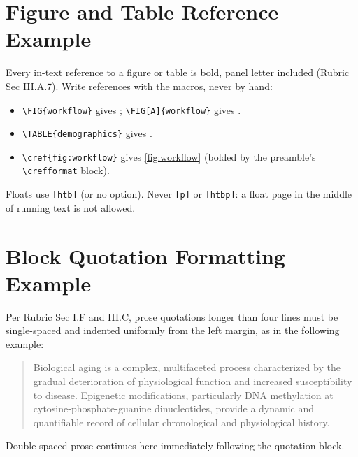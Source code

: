 \section{Figure and Table Reference Example}
Every in-text reference to a figure or table is bold, panel letter included (Rubric Sec III.A.7). Write references with the macros, never by hand:
\begin{itemize}
  \item \verb|\FIG{workflow}| gives ; \verb|\FIG[A]{workflow}| gives .
  \item \verb|\TABLE{demographics}| gives .
  \item \verb|\cref{fig:workflow}| gives \cref{fig:workflow} (bolded by the preamble's \verb|\crefformat| block).
\end{itemize}
Floats use \verb|[htb]| (or no option). Never \verb|[p]| or \verb|[htbp]|: a float page in the middle of running text is not allowed.

\section{Block Quotation Formatting Example}
Per Rubric Sec I.F and III.C, prose quotations longer than four lines must be single-spaced and indented uniformly from the left margin, as in the following example:

\begin{quotation}
  Biological aging is a complex, multifaceted process characterized by the gradual deterioration of physiological function and increased susceptibility to disease. Epigenetic modifications, particularly DNA methylation at cytosine-phosphate-guanine dinucleotides, provide a dynamic and quantifiable record of cellular chronological and physiological history.
\end{quotation}

Double-spaced prose continues here immediately following the quotation block.
